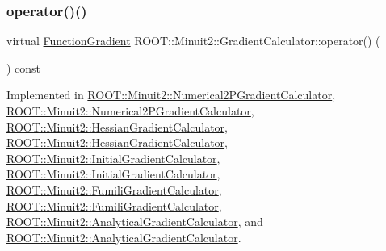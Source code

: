 \subsubsection{\texorpdfstring{operator()()}{operator()()}\hspace{0.1cm}{\footnotesize\ttfamily [1/4]}}
{\footnotesize\ttfamily virtual \mbox{\hyperlink{classROOT_1_1Minuit2_1_1FunctionGradient}{Function\+Gradient}} R\+O\+O\+T\+::\+Minuit2\+::\+Gradient\+Calculator\+::operator() (\begin{DoxyParamCaption}\item[{const \mbox{\hyperlink{classROOT_1_1Minuit2_1_1MinimumParameters}{Minimum\+Parameters}} \&}]{ }\end{DoxyParamCaption}) const\hspace{0.3cm}{\ttfamily [pure virtual]}}



Implemented in \mbox{\hyperlink{classROOT_1_1Minuit2_1_1Numerical2PGradientCalculator_a40aca4ad0b9583062fc830c359140b43}{R\+O\+O\+T\+::\+Minuit2\+::\+Numerical2\+P\+Gradient\+Calculator}}, \mbox{\hyperlink{classROOT_1_1Minuit2_1_1Numerical2PGradientCalculator_a8c90cd467631ecc4cac72187de948b05}{R\+O\+O\+T\+::\+Minuit2\+::\+Numerical2\+P\+Gradient\+Calculator}}, \mbox{\hyperlink{classROOT_1_1Minuit2_1_1HessianGradientCalculator_ada968380aae7c1c6b6d0716d6a9804b5}{R\+O\+O\+T\+::\+Minuit2\+::\+Hessian\+Gradient\+Calculator}}, \mbox{\hyperlink{classROOT_1_1Minuit2_1_1HessianGradientCalculator_af65e43d99c763df00e3d082d59a7a24d}{R\+O\+O\+T\+::\+Minuit2\+::\+Hessian\+Gradient\+Calculator}}, \mbox{\hyperlink{classROOT_1_1Minuit2_1_1InitialGradientCalculator_afae3b02315c3ed44cdd94dff4bd53462}{R\+O\+O\+T\+::\+Minuit2\+::\+Initial\+Gradient\+Calculator}}, \mbox{\hyperlink{classROOT_1_1Minuit2_1_1InitialGradientCalculator_ae3f248b2e9e40bc62ee7dc68c8ee010f}{R\+O\+O\+T\+::\+Minuit2\+::\+Initial\+Gradient\+Calculator}}, \mbox{\hyperlink{classROOT_1_1Minuit2_1_1FumiliGradientCalculator_a23fd61bceabbf88e66c5abe6b2815331}{R\+O\+O\+T\+::\+Minuit2\+::\+Fumili\+Gradient\+Calculator}}, \mbox{\hyperlink{classROOT_1_1Minuit2_1_1FumiliGradientCalculator_a23fd61bceabbf88e66c5abe6b2815331}{R\+O\+O\+T\+::\+Minuit2\+::\+Fumili\+Gradient\+Calculator}}, \mbox{\hyperlink{classROOT_1_1Minuit2_1_1AnalyticalGradientCalculator_aff4787568d15aaf6dac1c8ffa1bd9db7}{R\+O\+O\+T\+::\+Minuit2\+::\+Analytical\+Gradient\+Calculator}}, and \mbox{\hyperlink{classROOT_1_1Minuit2_1_1AnalyticalGradientCalculator_a711ef74b01726ca7081031998c44d81b}{R\+O\+O\+T\+::\+Minuit2\+::\+Analytical\+Gradient\+Calculator}}.

